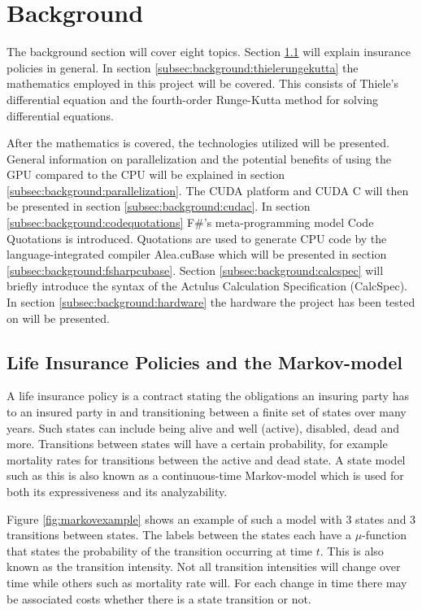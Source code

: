 \section{Background}
The background section will cover eight topics.
Section \ref{subsec:background:lifeinsurance} will explain insurance policies in general.
In section \ref{subsec:background:thielerungekutta} the mathematics employed in this project will be covered. 
This consists of Thiele's differential equation and the fourth-order Runge-Kutta method for solving differential equations.

After the mathematics is covered, the technologies utilized will be presented.
General information on parallelization and the potential benefits of using the GPU compared to the CPU will be explained in section \ref{subsec:background:parallelization}.
The CUDA platform and CUDA C will then be presented in section \ref{subsec:background:cudac}.
In section \ref{subsec:background:codequotations} F\#'s meta-programming model Code Quotations is introduced.
Quotations are used to generate CPU code by the language-integrated compiler Alea.cuBase which will be presented in section \ref{subsec:background:fsharpcubase}.
Section \ref{subsec:background:calcspec} will briefly introduce the syntax of the Actulus Calculation Specification (CalcSpec).
In section \ref{subsec:background:hardware} the hardware the project has been tested on will be presented.

\subsection{Life Insurance Policies and the Markov-model}\label{subsec:background:lifeinsurance}
A life insurance policy is a contract stating the obligations an insuring party has to an insured party in and transitioning between a finite set of states over many years.
Such states can include being alive and well (active), disabled, dead and more.
Transitions between states will have a certain probability, for example mortality rates for transitions between the active and dead state.
A state model such as this is also known as a continuous-time Markov-model which is used for both its expressiveness and its analyzability.

Figure \ref{fig:markovexample} shows an example of such a model with 3 states and 3 transitions between states. 
The labels between the states each have a $\mu$-function that states the probability of the transition occurring at time $t$. 
This is also known as the transition intensity.
Not all transition intensities will change over time while others such as mortality rate will.
For each change in time there may be associated costs whether there is a state transition or not.

